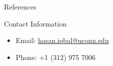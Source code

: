 \documentclass[final]{beamer}
\newlength{\onecolwid}
\begin{document}
\begin{frame}[t]
\begin{columns}[t]
\begin{column}{\onecolwid}

\begin{block}{References}

\nocite{*} %
\small{
\vspace{0.75in}}

\end{block}


%
%
%



\vspace{-.9in}
\begin{alertblock}{Contact Information}

\begin{itemize}
\item Email: \href{mailto:hasan.iqbal@uconn.edu}{hasan.iqbal@uconn.edu}
\item Phone: +1 (312) 975 7006
\end{itemize}

\end{alertblock}



\end{column} %

\end{columns} %

\end{frame} %
\end{document}
